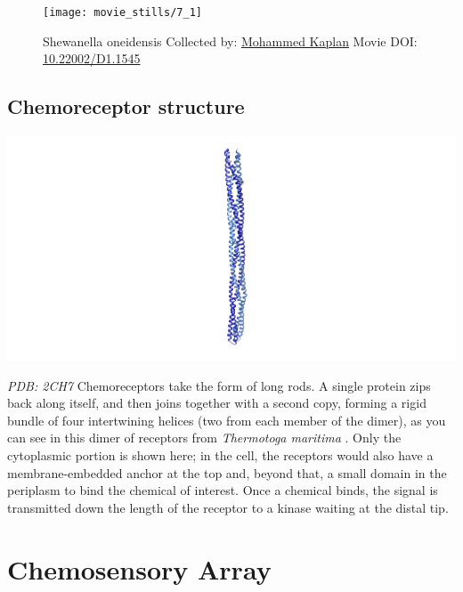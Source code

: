 \documentclass[]{tufte-book}
\begin{document}
\begin{figure}
\texttt{[image: movie\_stills/7\_1]} \caption[Shewanella oneidensis Collected by:
\protect\hyperlink{mohammed_kaplan}{Mohammed Kaplan} Movie DOI:
\href{https://doi.org/10.22002/D1.1545}{10.22002/D1.1545}]{Shewanella oneidensis Collected by:
\protect\hyperlink{mohammed_kaplan}{Mohammed Kaplan} Movie DOI:
\href{https://doi.org/10.22002/D1.1545}{10.22002/D1.1545}}\label{fig:7-1}
\end{figure}

\subsection{Chemoreceptor structure}\label{Chemoreceptor_structure}

\includegraphics{img/schematics/7_1_1}

\emph{PDB: 2CH7} Chemoreceptors take the form of long rods. A single
protein zips back along itself, and then joins together with a second
copy, forming a rigid bundle of four intertwining helices (two from each
member of the dimer), as you can see in this dimer of receptors from
\emph{Thermotoga maritima} \citep{park2006}. Only the cytoplasmic
portion is shown here; in the cell, the receptors would also have a
membrane-embedded anchor at the top and, beyond that, a small domain in
the periplasm to bind the chemical of interest. Once a chemical binds,
the signal is transmitted down the length of the receptor to a kinase
waiting at the distal tip.

\section{Chemosensory Array}\label{chemosensory-array}
\end{document}
